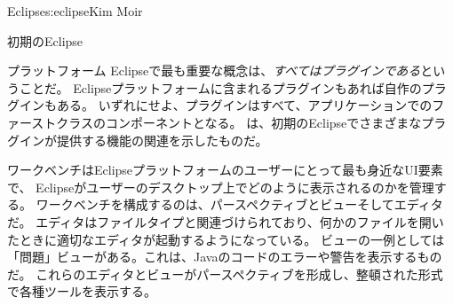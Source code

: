 \begin{aosachapter}{Eclipse}{s:eclipse}{Kim Moir}
\begin{aosasect1}{初期のEclipse}
\begin{aosasect2}{プラットフォーム}
Eclipseで最も重要な概念は、\emph{すべてはプラグインである}ということだ。
Eclipseプラットフォームに含まれるプラグインもあれば自作のプラグインもある。
いずれにせよ、プラグインはすべて、アプリケーションでのファーストクラスのコンポーネントとなる。
は、初期のEclipseでさまざまなプラグインが提供する機能の関連を示したものだ。


ワークベンチはEclipseプラットフォームのユーザーにとって最も身近なUI要素で、
Eclipseがユーザーのデスクトップ上でどのように表示されるのかを管理する。
ワークベンチを構成するのは、パースペクティブとビューそしてエディタだ。
エディタはファイルタイプと関連づけられており、何かのファイルを開いたときに適切なエディタが起動するようになっている。
ビューの一例としては「問題」ビューがある。これは、Javaのコードのエラーや警告を表示するものだ。
これらのエディタとビューがパースペクティブを形成し、整頓された形式で各種ツールを表示する。


\end{aosasect2}
\end{aosasect1}
\end{aosachapter}
